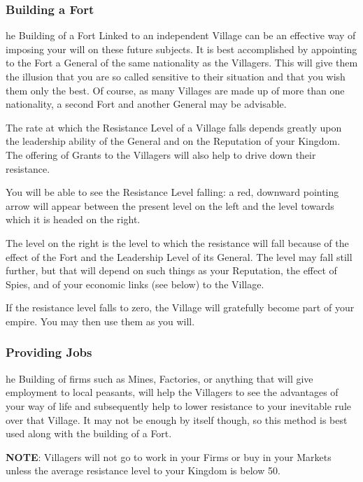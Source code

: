 \subsubsection{\textsf{Building a Fort}}

he Building of a Fort Linked to an independent Village can be an effective way of imposing your will on these future subjects. It is best accomplished by appointing to the Fort a General of the same nationality as the Villagers. This will give them the illusion that you are so called sensitive to their situation and that you wish them only the best. Of course, as many Villages are made up of more than one nationality, a second Fort and another General may be advisable.

The rate at which the Resistance Level of a Village falls depends greatly upon the leadership ability of the General and on the Reputation of your Kingdom. The offering of Grants to the Villagers will also help to drive down their resistance.

You will be able to see the Resistance Level falling: a red, downward pointing arrow will appear between the present level on the left and the level towards which it is headed on the right.


The level on the right is the level to which the resistance will fall because of the effect of the Fort and the Leadership Level of its General. The level may fall still further, but that will depend on such things as your Reputation, the effect of Spies, and of your economic links (see below) to the Village.

If the resistance level falls to zero, the Village will gratefully become part of your empire. You may then use them as you will.

\subsubsection{\textsf{Providing Jobs}}

he Building of firms such as Mines, Factories, or anything that will give employment to local peasants, will help the Villagers to see the advantages of your way of life and subsequently help to lower resistance to your inevitable rule over that Village. It may not be enough by itself though, so this method is best used along with the building of a Fort.

\textbf{NOTE}: Villagers will not go to work in your Firms or buy in your Markets unless the average resistance level to your Kingdom is below 50. 

